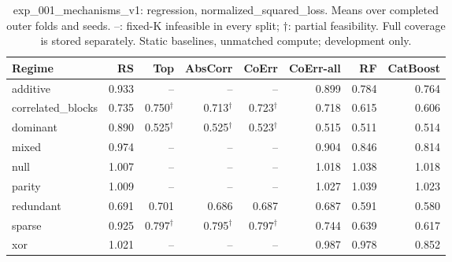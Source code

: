 \begin{table}[t]
\centering\small
\begin{tabular}{lrrrrrrr}
\toprule
Regime & RS & Top & AbsCorr & CoErr & CoErr-all & RF & CatBoost \\
\midrule
additive & 0.933 & -- & -- & -- & 0.899 & 0.784 & 0.764 \\
correlated\_blocks & 0.735 & 0.750$^{\dagger}$ & 0.713$^{\dagger}$ & 0.723$^{\dagger}$ & 0.718 & 0.615 & 0.606 \\
dominant & 0.890 & 0.525$^{\dagger}$ & 0.525$^{\dagger}$ & 0.523$^{\dagger}$ & 0.515 & 0.511 & 0.514 \\
mixed & 0.974 & -- & -- & -- & 0.904 & 0.846 & 0.814 \\
null & 1.007 & -- & -- & -- & 1.018 & 1.038 & 1.018 \\
parity & 1.009 & -- & -- & -- & 1.027 & 1.039 & 1.023 \\
redundant & 0.691 & 0.701 & 0.686 & 0.687 & 0.687 & 0.591 & 0.580 \\
sparse & 0.925 & 0.797$^{\dagger}$ & 0.795$^{\dagger}$ & 0.797$^{\dagger}$ & 0.744 & 0.639 & 0.617 \\
xor & 1.021 & -- & -- & -- & 0.987 & 0.978 & 0.852 \\
\bottomrule
\end{tabular}
\caption{exp\_001\_mechanisms\_v1: regression, normalized\_squared\_loss. Means over completed outer folds and seeds. --: fixed-K infeasible in every split; $\dagger$: partial feasibility. Full coverage is stored separately. Static baselines, unmatched compute; development only.}
\end{table}
